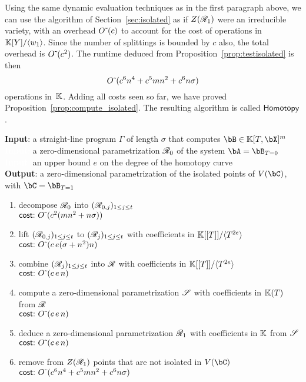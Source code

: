 \documentclass[12pt]{article}
\begin{document}
Using the same dynamic evaluation techniques as in the first paragraph
above, we can use the algorithm of Section~\ref{sec:isolated} as if
$Z(\mathscr{R}_1)$ were an irreducible variety, with an overhead ${O}{\,\tilde{ }\,}(c)$
to account for the cost of operations in $\mathbb{K}[Y]/\langle w_1 \rangle$.
Since the number of splittings is bounded by $c$ also, the total
overhead is ${O}{\,\tilde{ }\,}(c^2)$.  The runtime deduced from
Proposition~\ref{prop:testisolated} is then
$${O}{\,\tilde{ }\,}(c^6 n^4  +  c^5 m n^2  +c^6 n \sigma )$$ operations in~$\mathbb{K}$. Adding all
costs seen so far, we have proved
Proposition~\ref{prop:compute_isolated}. The resulting algorithm
is called $\mathsf{Homotopy}$.




\begin{algorithm}
\caption{$\mathsf{Homotopy}(\Gamma,\scrR_0,e)$}
{\bf Input}: a straight-line program $\Gamma$ of length $\sigma$ that computes $\bB \in \KK[T,\bX]^m$\\
\textcolor{white}{{\bf Input}:} a zero-dimensional parametrization $\mathscr{R}_0$ of the system $\bA=\bB_{T=0}$\\
\textcolor{white}{{\bf Input}:} an upper bound $e$ on the degree of the homotopy curve\\
{\bf Output}: a zero-dimensional parametrization of the isolated points of $V(\bC)$, with $\bC=\bB_{T=1}$
\begin{enumerate}
  \setlength\itemsep{0em}
\item decompose $\mathscr{R}_0$ into $(\mathscr{R}_{0,j})_{1 \leq j \leq t}$\\
$\text{\sf{cost:~}} {O}{\,\tilde{ }\,}(c^2 (mn^2 + n\sigma) )$
\item lift $(\mathscr{R}_{0,j})_{1 \leq j \leq t}$ to $(\mathscr{R}_j)_{1\leq j \leq t}$ with 
  coefficients in $\mathbb{K}[[T]]/\langle T^{2e}\rangle$\\
$\text{\sf{cost:~}} {O}{\,\tilde{ }\,}(c\,e (\sigma+n^2)n)$
\item combine $(\mathscr{R}_j)_{1 \leq j \leq t}$ into  $\mathscr{R}$ with coefficients in $\mathbb{K}[[T]]/\langle T^{2e}\rangle$\\
$\text{\sf{cost:~}} {O}{\,\tilde{ }\,}(c\,e\,n)$
\item compute a zero-dimensional parametrization $\mathscr{S}$ with coefficients in $\mathbb{K}(T)$ from $\mathscr{R}$\\
$\text{\sf{cost:~}} {O}{\,\tilde{ }\,}(c\,e\,n)$
\item deduce a zero-dimensional parametrization $\mathscr{R}_1$ with coefficients in $\mathbb{K}$ from $\mathscr{S}$\\
$\text{\sf{cost:~}} {O}{\,\tilde{ }\,}(c\,e\,n)$
\item\label{step:homot:final} remove from $Z(\mathscr{R}_1)$ points that are not isolated in $V(\bC)$ \\
  $\text{\sf{cost:~}} {O}{\,\tilde{ }\,}(c^6 n^4  + c^5 m n^2   + c^6 n \sigma )$
\end{enumerate}
\label{DetSys}
\end{algorithm}
 
\end{document}
